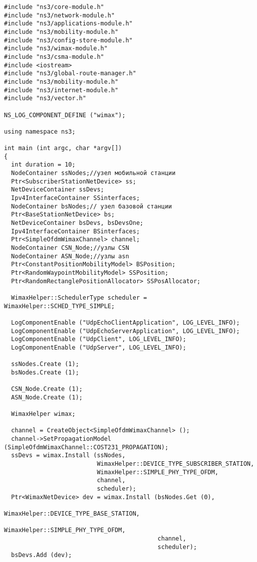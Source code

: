 \documentclass[14pt,a4paper]{article}
\begin{document}
 {\scriptsize \begin{verbatim}
#include "ns3/core-module.h"
#include "ns3/network-module.h"
#include "ns3/applications-module.h"
#include "ns3/mobility-module.h"
#include "ns3/config-store-module.h"
#include "ns3/wimax-module.h"
#include "ns3/csma-module.h"
#include <iostream>
#include "ns3/global-route-manager.h"
#include "ns3/mobility-module.h"
#include "ns3/internet-module.h"
#include "ns3/vector.h"

NS_LOG_COMPONENT_DEFINE ("wimax");

using namespace ns3;

int main (int argc, char *argv[])
{
  int duration = 10;
  NodeContainer ssNodes;//узел мобильной станции
  Ptr<SubscriberStationNetDevice> ss;
  NetDeviceContainer ssDevs;
  Ipv4InterfaceContainer SSinterfaces;
  NodeContainer bsNodes;// узел базовой станции
  Ptr<BaseStationNetDevice> bs;
  NetDeviceContainer bsDevs, bsDevsOne;
  Ipv4InterfaceContainer BSinterfaces;
  Ptr<SimpleOfdmWimaxChannel> channel;
  NodeContainer CSN_Node;//узлы CSN
  NodeContainer ASN_Node;//узлы asn
  Ptr<ConstantPositionMobilityModel> BSPosition;
  Ptr<RandomWaypointMobilityModel> SSPosition;
  Ptr<RandomRectanglePositionAllocator> SSPosAllocator;

  WimaxHelper::SchedulerType scheduler = WimaxHelper::SCHED_TYPE_SIMPLE;

  LogComponentEnable ("UdpEchoClientApplication", LOG_LEVEL_INFO);
  LogComponentEnable ("UdpEchoServerApplication", LOG_LEVEL_INFO);
  LogComponentEnable ("UdpClient", LOG_LEVEL_INFO);
  LogComponentEnable ("UdpServer", LOG_LEVEL_INFO);

  ssNodes.Create (1);
  bsNodes.Create (1);

  CSN_Node.Create (1);
  ASN_Node.Create (1);

  WimaxHelper wimax;

  channel = CreateObject<SimpleOfdmWimaxChannel> ();
  channel->SetPropagationModel (SimpleOfdmWimaxChannel::COST231_PROPAGATION);
  ssDevs = wimax.Install (ssNodes,
                          WimaxHelper::DEVICE_TYPE_SUBSCRIBER_STATION,
                          WimaxHelper::SIMPLE_PHY_TYPE_OFDM,
                          channel,
                          scheduler);
  Ptr<WimaxNetDevice> dev = wimax.Install (bsNodes.Get (0),
                                           WimaxHelper::DEVICE_TYPE_BASE_STATION,
                                           WimaxHelper::SIMPLE_PHY_TYPE_OFDM,
                                           channel,
                                           scheduler);
  bsDevs.Add (dev);


\end{verbatim}}
\end{document}
